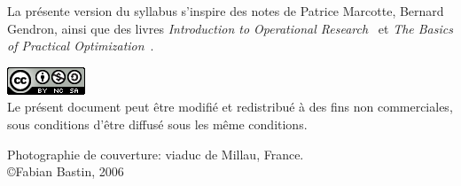 \documentclass[11pt]{book}%
\theoremstyle{plain}
\numberwithin{equation}{section}
\begin{document}

\noindent
\small
La présente version du syllabus s'inspire des notes de Patrice Marcotte, Bernard Gendron, ainsi que des livres {\sl Introduction to Operational Research}~\cite{HillLieb01} et {\sl The Basics of Practical Optimization}~\cite{Levy09}.


\noindent
\includegraphics{cc.png}\\
Le présent document peut être modifié et redistribué à des fins non commerciales, sous conditions d'être diffusé sous les même conditions.


{
\noindent
\footnotesize{Photographie de couverture: viaduc de Millau, France.\\
\copyright Fabian Bastin, 2006}
}

\tableofcontents

\mainmatter

















\backmatter



{}
\makeatletter


\makeatother

\end{document}

